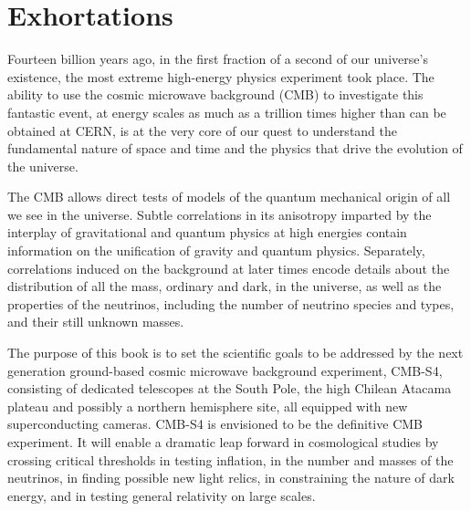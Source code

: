  
\chapter{Exhortations}
\label{chap:intro}






Fourteen billion years ago, in the first fraction of a second of our universe's existence, the most extreme high-energy physics experiment took place. The ability to use the cosmic microwave background (CMB) to investigate this fantastic event, at energy scales as much as a trillion times higher than can be obtained at CERN, is at the very core of our quest to understand the fundamental nature of space and time and the physics that drive the evolution of the universe. 

The CMB allows direct tests of models of the quantum mechanical origin of all we see in the universe. Subtle correlations in its anisotropy imparted by the interplay of gravitational and quantum physics at high energies contain information on the unification of gravity and quantum physics. Separately, correlations induced on the background at later times encode details about the distribution of all the mass, ordinary and dark, in the universe, as well as the properties of the neutrinos, including the number of neutrino species and types, and their still unknown masses. 

The purpose of this book is to set the scientific goals to be addressed by the next generation ground-based cosmic microwave background experiment, CMB-S4, consisting of dedicated telescopes at the South Pole, the high Chilean Atacama plateau and possibly a northern hemisphere site, all equipped with new superconducting cameras. CMB-S4 
is envisioned to be the definitive CMB experiment. It will enable a dramatic leap forward in cosmological studies by crossing critical thresholds in testing inflation, in the number and masses of the neutrinos, in finding possible new light relics, in  constraining the nature of dark energy, and in testing general relativity on large scales. 

